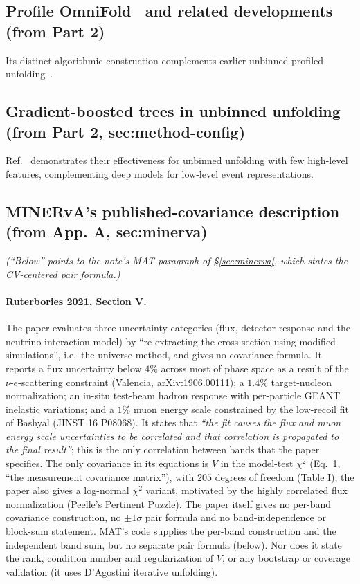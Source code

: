\subsection{Profile OmniFold~\cite{Zhu:2025profile} and related developments (from Part 2)}
Its distinct algorithmic construction complements earlier unbinned profiled unfolding~\cite{Chan:2023tbf}.

\subsection{Gradient-boosted trees in unbinned unfolding (from Part 2, sec:method-config)}
Ref.~\cite{Milton:2025tools} demonstrates their effectiveness for unbinned unfolding with few high-level features, complementing deep models for low-level event representations.

\subsection{MINERvA's published-covariance description (from App. A, sec:minerva)}
\noindent\emph{(``Below'' points to the note's MAT paragraph of \S\ref{sec:minerva}, which states the CV-centered pair formula.)}
\paragraph{Ruterbories 2021, Section V.} The paper evaluates three uncertainty categories (flux, detector response and the neutrino-interaction model) by ``re-extracting the cross section using modified simulations'', i.e.\ the universe method, and gives no covariance formula. It reports a flux uncertainty below $4\%$ across most of phase space as a result of the $\nu$-$e$-scattering constraint (Valencia, arXiv:1906.00111); a $1.4\%$ target-nucleon normalization; an in-situ test-beam hadron response with per-particle GEANT inelastic variations; and a $1\%$ muon energy scale constrained by the low-recoil fit of Bashyal (JINST 16 P08068). It states that \emph{``the fit causes the flux and muon energy scale uncertainties to be correlated and that correlation is propagated to the final result''}; this is the only correlation between bands that the paper specifies. The only covariance in its equations is $V$ in the model-test $\chi^{2}$ (Eq.~1, ``the measurement covariance matrix''), with $205$ degrees of freedom (Table I); the paper also gives a log-normal $\chi^{2}$ variant, motivated by the highly correlated flux normalization (Peelle's Pertinent Puzzle). The paper itself gives no per-band covariance construction, no $\pm1\sigma$ pair formula and no band-independence or block-sum statement. MAT's code supplies the per-band construction and the independent band sum, but no separate pair formula (below). Nor does it state the rank, condition number and regularization of $V$, or any bootstrap or coverage validation (it uses D'Agostini iterative unfolding).

